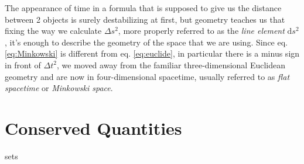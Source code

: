 The appearance of time in a formula that is supposed to give us the distance between 2 objects is surely destabilizing at first,
but geometry teaches us that fixing the way we calculate $\Delta s^2$,
more properly referred to as the \textit{line element} $\mathrm{d}s^2$,
it's enough to describe the geometry of the space that we are using.
Since eq. \ref{eq:Minkowski} is different from eq. \ref{eq:euclide},
in particular there is a minus sign in front of $\Delta t^2$,
we moved away from the familiar three-dimensional Euclidean geometry and are now in four-dimensional spacetime,
usually referred to as \textit{flat spacetime} or \textit{Minkowski space}.











\section{Conserved Quantities}
\Glspl{set}

